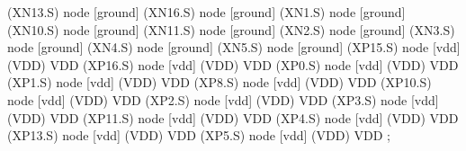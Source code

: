 \begin{circuitikz}[american]

	(XN13.S) node [ground] {}
	(XN16.S) node [ground] {}
	(XN1.S) node [ground] {}
	(XN10.S) node [ground] {}
	(XN11.S) node [ground] {}
	(XN2.S) node [ground] {}
	(XN3.S) node [ground] {}
	(XN4.S) node [ground] {}
	(XN5.S) node [ground] {}
	(XP15.S) node [vdd] (VDD) {VDD}
	(XP16.S) node [vdd] (VDD) {VDD}
	(XP0.S) node [vdd] (VDD) {VDD}
	(XP1.S) node [vdd] (VDD) {VDD}
	(XP8.S) node [vdd] (VDD) {VDD}
	(XP10.S) node [vdd] (VDD) {VDD}
	(XP2.S) node [vdd] (VDD) {VDD}
	(XP3.S) node [vdd] (VDD) {VDD}
	(XP11.S) node [vdd] (VDD) {VDD}
	(XP4.S) node [vdd] (VDD) {VDD}
	(XP13.S) node [vdd] (VDD) {VDD}
	(XP5.S) node [vdd] (VDD) {VDD}
;

\end{circuitikz}
